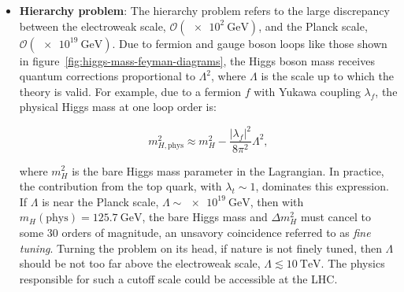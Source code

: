\begin{itemize}
	\item \textbf{Hierarchy problem}: The hierarchy problem refers to the large discrepancy between the electroweak scale, $\mathcal{O}(\SI{e2}{\giga\electronvolt})$, and the Planck scale, $\mathcal{O}(\SI{e19}{\giga\electronvolt})$. Due to fermion and gauge boson loops like those shown in figure~\ref{fig:higgs-mass-feyman-diagrams}, the Higgs boson mass receives quantum corrections proportional to $\Lambda^2$, where $\Lambda$ is the scale up to which the theory is valid. For example, due to a fermion $f$ with Yukawa coupling $\lambda_f$, the physical Higgs mass at one loop order is:

	\begin{equation}\label{eqn:higgs-mass-divergence}
		m_{H,\mathrm{phys}}^2 \approx m_{H}^2 -\frac{|\lambda_f|^2}{8\pi^2} \Lambda^2,
	\end{equation}

	where $m_{H}^2$ is the bare Higgs mass parameter in the Lagrangian. In practice, the contribution from the top quark, with $\lambda_t\sim1$, dominates this expression. If $\Lambda$ is near the Planck scale, $\Lambda\sim\SI{e19}{\giga\electronvolt}$, then with $m_H(\mathrm{phys})=\SI{125.7}{\giga\electronvolt}$, the bare Higgs mass and $\Delta m_H^2$ must cancel to some 30 orders of magnitude, an unsavory coincidence referred to as \emph{fine tuning}. Turning the problem on its head, if nature is not finely tuned, then $\Lambda$ should be not too far above the electroweak scale, $\Lambda \lesssim \SI{10}{\tera\electronvolt}$. The physics responsible for such a cutoff scale could be accessible at the LHC. 


\end{itemize}
